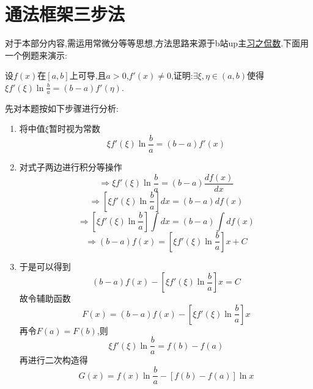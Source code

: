 \chapter{通法框架三步法}

对于本部分内容,需运用常微分等等思想,方法思路来源于b站up主\href{https://space.bilibili.com/1733573094}{习之侃数}.下面用一个例题来演示:

\begin{example}
	设$f(x)$在$[a,b]$上可导,且$a>0$,$f'(x) \ne 0$,证明:$\exists \xi,\eta \in(a,b)$使得$\xi f'\left( \xi \right) \ln \frac{b}{a}=\left( b-a \right) f'\left( \eta \right)$.
\end{example}

\begin{note}
	先对本题按如下步骤进行分析:
	\begin{enumerate}
		\item 将中值$\xi$暂时视为常数
		      $$\xi f'\left( \xi \right) \ln \frac{b}{a}=\left( b-a \right) f'\left( x \right)$$
		\item 对式子两边进行积分等操作
		      $$\Rightarrow \xi f'\left( \xi \right) \ln \frac{b}{a}=\left( b-a \right) \frac{df\left( x \right)}{dx}$$
		      $$
			      \Rightarrow \left[ \xi f'\left( \xi \right) \ln \frac{b}{a} \right] dx=\left( b-a \right) df\left( x \right)
		      $$
		      $$
			      \Rightarrow \left[ \xi f'\left( \xi \right) \ln \frac{b}{a} \right] \int{dx}=\left( b-a \right) \int{df\left( x \right)}
		      $$
		      $$
			      \Rightarrow \left( b-a \right) f\left( x \right) =\left[ \xi f'\left( \xi \right) \ln \frac{b}{a} \right] x+C
		      $$
		\item 于是可以得到
		      $$
			      \left( b-a \right) f\left( x \right) -\left[ \xi f'\left( \xi \right) \ln \frac{b}{a} \right] x=C
		      $$故令辅助函数$$
			      F\left( x \right) =\left( b-a \right) f\left( x \right) -\left[ \xi f'\left( \xi \right) \ln \frac{b}{a} \right] x
		      $$再令$F(a)=F(b)$,则$$
			      \xi f'\left( \xi \right) \ln \frac{b}{a}=f\left( b \right) -f\left( a \right)
		      $$再进行二次构造得
		      $$
			      G\left( x \right) =f\left( x \right) \ln \frac{b}{a}-\left[ f\left( b \right) -f\left( a \right) \right] \ln x
		      $$
	\end{enumerate}
\end{note}

